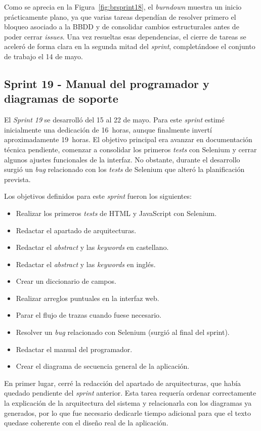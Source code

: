 Como se aprecia en la Figura~\ref{fig:brsprint18}, el \textit{burndown} muestra un inicio prácticamente plano, ya que varias tareas dependían de resolver primero el bloqueo asociado a la BBDD y de consolidar cambios estructurales antes de poder cerrar \textit{issues}. Una vez resueltas esas dependencias, el cierre de tareas se aceleró de forma clara en la segunda mitad del \textit{sprint}, completándose el conjunto de trabajo el 14 de mayo.

\subsection{Sprint 19 - Manual del programador y diagramas de soporte}
El \textit{Sprint 19} se desarrolló del 15 al 22 de mayo. Para este \textit{sprint} estimé inicialmente una dedicación de 16~horas, aunque finalmente invertí aproximadamente 19~horas. El objetivo principal era avanzar en documentación técnica pendiente, comenzar a consolidar los primeros \textit{tests} con Selenium y cerrar algunos ajustes funcionales de la interfaz. No obstante, durante el desarrollo surgió un \textit{bug} relacionado con los \textit{tests} de Selenium que alteró la planificación prevista.

Los objetivos definidos para este \textit{sprint} fueron los siguientes:
\begin{itemize}
	\item Realizar los primeros \textit{tests} de HTML y JavaScript con Selenium.
	\item Redactar el apartado de arquitecturas.
	\item Redactar el \textit{abstract} y las \textit{keywords} en castellano.
	\item Redactar el \textit{abstract} y las \textit{keywords} en inglés.
	\item Crear un diccionario de campos.
	\item Realizar arreglos puntuales en la interfaz web.
	\item Parar el flujo de trazas cuando fuese necesario.
	\item Resolver un \textit{bug} relacionado con Selenium (surgió al final del sprint).
	\item Redactar el manual del programador.
	\item Crear el diagrama de secuencia general de la aplicación.
\end{itemize}

En primer lugar, cerré la redacción del apartado de arquitecturas, que había quedado pendiente del \textit{sprint} anterior. Esta tarea requería ordenar correctamente la explicación de la arquitectura del sistema y relacionarla con los diagramas ya generados, por lo que fue necesario dedicarle tiempo adicional para que el texto quedase coherente con el diseño real de la aplicación.

